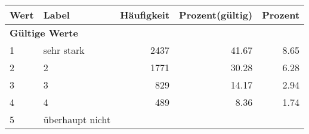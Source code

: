      \begin{longtable}{lXrrr}
     \toprule
     \textbf{Wert} & \textbf{Label} & \textbf{Häufigkeit} & \textbf{Prozent(gültig)} & \textbf{Prozent} \\
     \endhead
     \midrule
     \multicolumn{5}{l}{\textbf{Gültige Werte}}\\

     1 &
     \multicolumn{1}{X}{ sehr stark   } &


       \num{2437} &
       \num[round-mode=places,round-precision=2]{41.67} &
         \num[round-mode=places,round-precision=2]{8.65} \\

     2 &
     \multicolumn{1}{X}{ 2   } &


       \num{1771} &
       \num[round-mode=places,round-precision=2]{30.28} &
         \num[round-mode=places,round-precision=2]{6.28} \\

     3 &
     \multicolumn{1}{X}{ 3   } &


       \num{829} &
       \num[round-mode=places,round-precision=2]{14.17} &
         \num[round-mode=places,round-precision=2]{2.94} \\

     4 &
     \multicolumn{1}{X}{ 4   } &


       \num{489} &
       \num[round-mode=places,round-precision=2]{8.36} &
         \num[round-mode=places,round-precision=2]{1.74} \\

     5 &
     \multicolumn{1}{X}{ überhaupt nicht   } &



\end{longtable}
